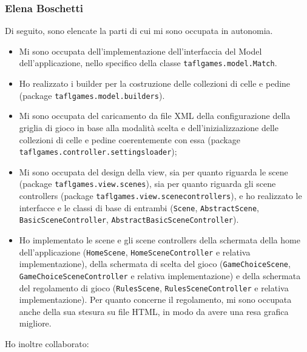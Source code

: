 \documentclass[a4paper,12pt]{report}
\begin{document}
\subsubsection{Elena Boschetti}

Di seguito, sono elencate la parti di cui mi sono occupata in autonomia.

\begin{itemize}
	\item Mi sono occupata dell'implementazione dell'interfaccia del Model dell'applicazione, nello specifico della classe \texttt{taflgames.model.Match}.
	\item Ho realizzato i builder per la costruzione delle collezioni di celle e pedine (package \texttt{taflgames.model.builders}).
	\item Mi sono occupata del caricamento da file XML della configurazione della griglia di gioco in base alla modalità scelta e dell'inizializzazione delle collezioni di celle e pedine coerentemente con essa (package \texttt{taflgames.controller.settingsloader});
	\item Mi sono occupata del design della view, sia per quanto riguarda le scene (package \texttt{taflgames.view.scenes}), sia per quanto riguarda gli scene controllers (package \texttt{taflgames.view.scenecontrollers}), e ho realizzato le interfacce e le classi di base di entrambi (\texttt{Scene}, \texttt{AbstractScene}, \texttt{BasicSceneController}, \texttt{AbstractBasicSceneController}).
	\item Ho implementato le scene e gli scene controllers della schermata della home dell'applicazione (\texttt{HomeScene}, \texttt{HomeSceneController} e relativa implementazione), della schermata di scelta del gioco (\texttt{GameChoiceScene}, \texttt{GameChoiceSceneController} e relativa implementazione) e della schermata del regolamento di gioco (\texttt{RulesScene}, \texttt{RulesSceneController} e relativa implementazione). Per quanto concerne il regolamento, mi sono occupata anche della sua stesura su file HTML, in modo da avere una resa grafica migliore.
	
\end{itemize}

Ho inoltre collaborato:
\end{document}
